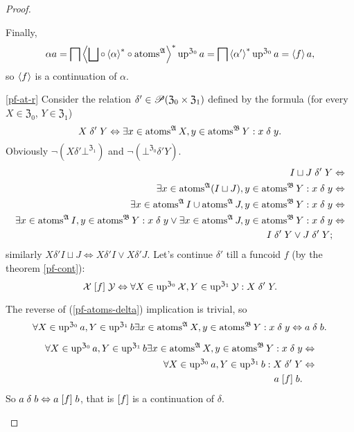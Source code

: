 \begin{proof}
\begin{widedisorder}
Finally,
\[
\alpha a=\bigsqcap\left\langle \bigsqcup\circ\left\langle \alpha\right\rangle ^{\ast}\circ\operatorname{atoms}^{\mathfrak{A}}\right\rangle ^{\ast}\operatorname{up}^{\mathfrak{Z}_{0}}a=\bigsqcap\left\langle \alpha'\right\rangle ^{\ast}\operatorname{up}^{\mathfrak{Z}_{0}}a=\left\langle f\right\rangle a,
\]
so $\left\langle f\right\rangle$ is a continuation of $\alpha$.

\item [{\ref{pf-at-r}}] Consider the relation $\delta'\in\mathscr{P}(\mathfrak{Z}_{0}\times\mathfrak{Z}_{1})$
defined by the formula (for every $X\in\mathfrak{Z}_{0}$, $Y\in\mathfrak{Z}_{1}$)
\[
X\mathrel{\delta'}Y\Leftrightarrow\exists x\in\operatorname{atoms}^{\mathfrak{A}}X,y\in\operatorname{atoms}^{\mathfrak{B}}Y:x\mathrel{\delta}y.
\]
Obviously $\neg(X\mathrel{\delta'}\bot^{\mathfrak{Z}_{1}})$ and $\neg(\bot^{\mathfrak{Z}_{0}}\mathrel{\delta'}Y)$.
\begin{align*}
I\sqcup J\mathrel{\delta'}Y & \Leftrightarrow\\
\exists x\in\operatorname{atoms}^{\mathfrak{A}}(I\sqcup J),y\in\operatorname{atoms}^{\mathfrak{B}}Y:x\mathrel{\delta}y & \Leftrightarrow\\
\exists x\in\operatorname{atoms}^{\mathfrak{A}}I\cup\operatorname{atoms}^{\mathfrak{A}}J,y\in\operatorname{atoms}^{\mathfrak{B}}Y:x\mathrel{\delta}y & \Leftrightarrow\\
\exists x\in\operatorname{atoms}^{\mathfrak{A}}I,y\in\operatorname{atoms}^{\mathfrak{B}}Y:x\mathrel{\delta}y\lor\exists x\in\operatorname{atoms}^{\mathfrak{A}}J,y\in\operatorname{atoms}^{\mathfrak{B}}Y:x\mathrel{\delta}y & \Leftrightarrow\\
I\mathrel{\delta'}Y\lor J\mathrel{\delta'}Y;
\end{align*}
similarly $X\mathrel{\delta'}I\sqcup J\Leftrightarrow X\mathrel{\delta'}I\lor X\mathrel{\delta'}J$.
Let's continue $\delta'$ till a funcoid $f$ (by the theorem \ref{pf-cont}):
\[
\mathcal{X}\mathrel{\left[f\right]}\mathcal{Y}\Leftrightarrow\forall X\in\operatorname{up}^{\mathfrak{Z}_{0}}\mathcal{X},Y\in\operatorname{up}^{\mathfrak{Z}_{1}}\mathcal{Y}:X\mathrel{\delta'}Y.
\]



The reverse of (\ref{pf-atoms-delta}) implication is trivial, so
\[
\forall X\in\operatorname{up}^{\mathfrak{Z}_{0}}a,Y\in\operatorname{up}^{\mathfrak{Z}_{1}}b\exists x\in\operatorname{atoms}^{\mathfrak{A}}X,y\in\operatorname{atoms}^{\mathfrak{B}}Y:x\mathrel{\delta}y\Leftrightarrow a\mathrel{\delta}b.
\]



\begin{align*}
\forall X\in\operatorname{up}^{\mathfrak{Z}_{0}}a,Y\in\operatorname{up}^{\mathfrak{Z}_{1}}b\exists x\in\operatorname{atoms}^{\mathfrak{A}}X,y\in\operatorname{atoms}^{\mathfrak{B}}Y:x\mathrel{\delta}y & \Leftrightarrow\\
\forall X\in\operatorname{up}^{\mathfrak{Z}_{0}}a,Y\in\operatorname{up}^{\mathfrak{Z}_{1}}b:X\mathrel{\delta'}Y & \Leftrightarrow\\
a\mathrel{\left[f\right]}b.
\end{align*}
So $a\mathrel\delta b\Leftrightarrow a\mathrel{\left[f\right]}b$, that is $\mathrel{\left[f\right]}$
is a continuation of $\delta$.

\end{widedisorder}
\end{proof}
